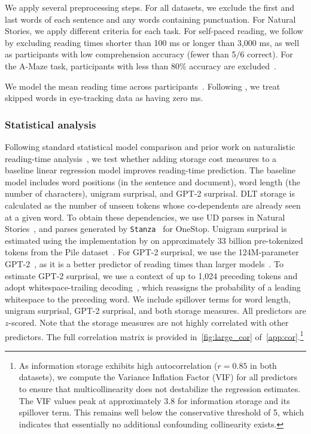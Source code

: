 \documentclass[11pt]{article}
\begin{document}
We apply several preprocessing steps. For all datasets, we exclude the first and last words of each sentence and any words containing punctuation.
For Natural Stories, we apply different criteria for each task.
For self-paced reading, we follow \citet{futrell-etal-2021} by excluding reading times shorter than 100 ms or longer than 3,000 ms, as well as participants with low comprehension accuracy (fewer than 5$/$6 correct).
For the A-Maze task, participants with less than 80\% accuracy are excluded~\citep{boyce-levy-2023}.

We model the mean reading time across participants~\citep{smith-levy-2013,goodkind-bicknell-2018,wilcox-etal-2023-language,wilcox-etal-2023-testing}.
Following \citet{wilcox-etal-2023-language,wilcox-etal-2023-testing}, we treat skipped words in eye-tracking data as having zero ms.



\subsubsection{Statistical analysis}
Following standard statistical model comparison and prior work on naturalistic reading-time analysis~\citep[e.g.,][]{frank-bod-2011,goodkind-bicknell-2018,wilcox-etal-2023-testing}, we test whether adding storage cost measures to a baseline linear regression model improves reading-time prediction.
The baseline model includes word positions (in the sentence and document), word length (the number of characters), unigram surprisal, and GPT-2 surprisal.
DLT storage is calculated as the number of unseen tokens whose co-dependents are already seen at a given word.
To obtain these dependencies, we use UD parses in Natural Stories~\citep{futrell-etal-2021}, and parses generated by \texttt{Stanza}~\citep{qi-etal-2020} for OneStop.
Unigram surprisal is estimated using the implementation by \citet{oh-etal-2024} on approximately 33 billion pre-tokenized tokens from the Pile dataset~\citep{gao-etal-2020}.
For GPT-2 surprisal, we use the 124M-parameter GPT-2~\citep{radford-etal-2019}, as it is a better predictor of reading times than larger models~\citep{oh-schuler-2023,shain-etal-2024}.
To estimate GPT-2 surprisal, we use a context of up to 1,024 preceding tokens and adopt whitespace-trailing decoding~\citep{oh-schuler-2024}, which reassigns the probability of a leading whitespace to the preceding word.
We include spillover terms for word length, unigram surprisal, GPT-2 surprisal, and both storage measures.
All predictors are $z$-scored.
Note that the storage measures are not highly correlated with other predictors. The full correlation matrix is provided in~\cref{fig:large_cor} of~\cref{app:cor}.\footnote{
    As information storage exhibits high autocorrelation ($r = 0.85$ in both datasets), we compute the Variance Inflation Factor (VIF) for all predictors to ensure that multicollinearity does not destabilize the regression estimates.
    The VIF values peak at approximately 3.8 for information storage and its spillover term. This remains well below the conservative threshold of 5, which indicates that essentially no additional confounding collinearity exists.
}
\end{document}
